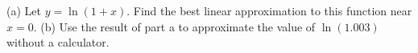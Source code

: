 (a) Let $y=\ln(1+x)$. Find the best
linear approximation to this function near $x=0$.\answercheck\hwendpart
(b) Use the result of part a to approximate the value of $\ln(1.003)$ without a calculator.\answercheck\hwendpart
